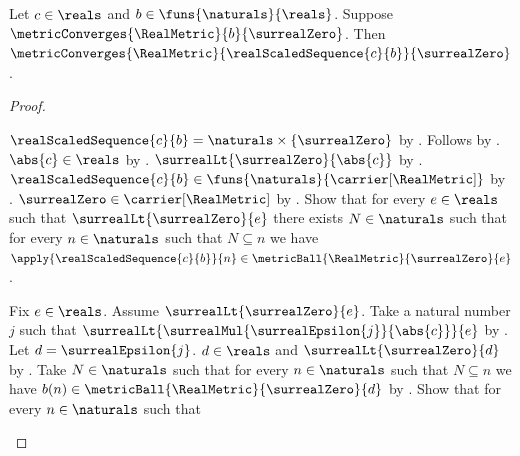 \begin{theorem}\label{real_sequence_scale_converges_zero}
    Let $c\in\reals$ and $b\in\funs{\naturals}{\reals}$.
    Suppose $\metricConverges{\RealMetric}{b}{\surrealZero}$.
    Then
        $\metricConverges{\RealMetric}
            {\realScaledSequence{c}{b}}{\surrealZero}$.
\end{theorem}
\begin{proof}
    \begin{byCase}
            $\realScaledSequence{c}{b}
                =\naturals\times\{\surrealZero\}$
                by .
            Follows by .
            $\abs{c}\in\reals$ by .
            $\surrealLt{\surrealZero}{\abs{c}}$
                by
                .
            $\realScaledSequence{c}{b}\in
                \funs{\naturals}{\carrier[\RealMetric]}$
                by
                .
            $\surrealZero\in\carrier[\RealMetric]$
                by
                .
            Show that for every $e\in\reals$ such that
                $\surrealLt{\surrealZero}{e}$ there exists $N\in\naturals$
                such that for every $n\in\naturals$ such that
                    $N\subseteq n$ we have
                    $\apply{\realScaledSequence{c}{b}}{n}
                        \in\metricBall{\RealMetric}{\surrealZero}{e}$.
            \begin{subproof}
                Fix $e\in\reals$.
                Assume $\surrealLt{\surrealZero}{e}$.
                Take a natural number $j$ such that
                    $\surrealLt{
                        \surrealMul{\surrealEpsilon{j}}{\abs{c}}}{e}$
                    by .
                Let $d=\surrealEpsilon{j}$.
                $d\in\reals$ and $\surrealLt{\surrealZero}{d}$
                    by
                    .
                Take $N\in\naturals$ such that for every $n\in\naturals$
                    such that $N\subseteq n$ we have
                        $b(n)\in\metricBall{\RealMetric}
                            {\surrealZero}{d}$
                    by .
                Show that for every $n\in\naturals$ such that

\end{subproof}
\end{byCase}
\end{proof}
